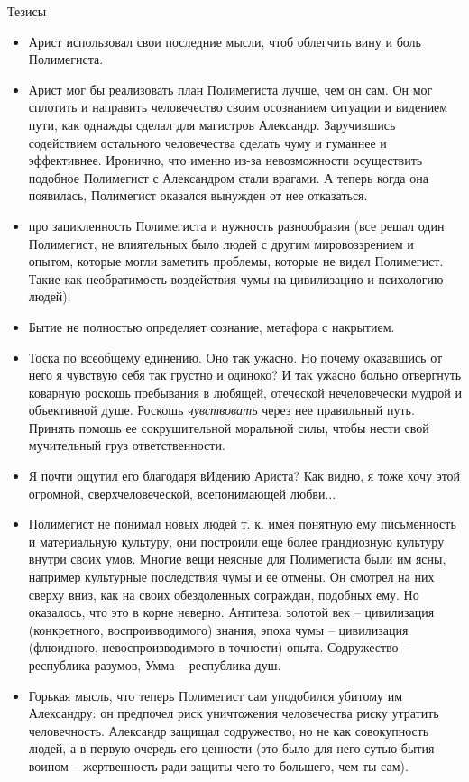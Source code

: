 \documentclass[12pt,a4paper]{article}
\newenvironment{meta}{
\begin{tcolorbox}[breakable, colback=lightgray, colframe=gray]
}{
\end{tcolorbox}
}
\begin{document}
\begin{meta}
Тезисы
\begin{itemize}
	\item Арист использовал свои последние мысли, чтоб облегчить вину и боль Полимегиста.
	\item Арист мог бы реализовать план Полимегиста лучше, чем он сам. Он мог сплотить и направить человечество своим осознанием ситуации и видением пути, как однажды сделал для магистров Александр. Заручившись содействием остального человечества сделать чуму и гуманнее и эффективнее. Иронично, что именно из-за невозможности осуществить подобное Полимегист с Александром стали врагами. А теперь когда она появилась, Полимегист оказался вынужден от нее отказаться.
	\item про зацикленность Полимегиста и нужность разнообразия (все решал один Полимегист, не влиятельных было людей с другим мировоззрением и опытом, которые могли заметить проблемы, которые не видел Полимегист. Такие как необратимость воздействия чумы на цивилизацию и психологию людей).
	\item Бытие не полностью определяет сознание, метафора с накрытием.
	\item Тоска по всеобщему единению. Оно так ужасно. Но почему оказавшись от него я чувствую себя так грустно и одиноко? И так ужасно больно отвергнуть коварную роскошь пребывания в любящей, отеческой нечеловечески мудрой и объективной душе. Роскошь \textit{чувствовать} через нее правильный путь. Принять помощь ее сокрушительной моральной силы, чтобы нести свой мучительный груз ответственности.
	\item Я почти ощутил его благодаря вИдению Ариста? Как видно, я тоже хочу этой огромной, сверхчеловеческой, всепонимающей любви...
	\item Полимегист не понимал новых людей т. к. имея понятную ему письменность и материальную культуру, они построили еще более грандиозную культуру внутри своих умов. Многие вещи неясные для Полимегиста были им ясны, например культурные последствия чумы и ее отмены. Он смотрел на них сверху вниз, как на своих обездоленных сограждан, подобных ему. Но оказалось, что это в корне неверно. Антитеза: золотой век -- цивилизация (конкретного, воспроизводимого) знания, эпоха чумы -- цивилизация (флюидного, невоспроизводимого в точности) опыта. Содружество -- республика разумов, Умма -- республика душ.
	
	\item Горькая мысль, что теперь Полимегист сам уподобился убитому им Александру: он предпочел риск уничтожения человечества риску утратить человечность. Александр защищал содружество, но не как совокупность людей, а в первую очередь его ценности (это было для него сутью бытия воином -- жертвенность ради защиты чего-то большего, чем ты сам).
	

\end{itemize}
\end{meta}
\end{document}

